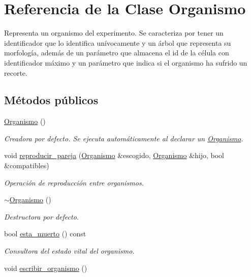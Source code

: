 \hypertarget{class_organismo}{\section{Referencia de la Clase Organismo}
\label{class_organismo}
}


Representa un organismo del experimento. Se caracteriza por tener un identificador que lo identifica unívocamente y un árbol que representa su morfología, además de un parámetro que almacena el id de la célula con identificador máximo y un parámetro que indica si el organismo ha sufrido un recorte.  


\subsection*{Métodos públicos}
\begin{DoxyCompactItemize}
\item 
\hyperlink{class_organismo_aa5dbeed205b53c0e555ef2a6456da144}{Organismo} ()
\begin{DoxyCompactList}\small\item\em Creadora por defecto. Se ejecuta automáticamente al declarar un \hyperlink{class_organismo}{Organismo}. \end{DoxyCompactList}\item 
void \hyperlink{class_organismo_a3a4ab01f4ad3cdc1d12361a7a3965009}{reproducir\-\_\-pareja} (\hyperlink{class_organismo}{Organismo} \&escogido, \hyperlink{class_organismo}{Organismo} \&hijo, bool \&compatibles)
\begin{DoxyCompactList}\small\item\em Operación de reproducción entre organismos. \end{DoxyCompactList}\item 
\hyperlink{class_organismo_ad1ba743e609a358f1479ebf341220747}{$\sim$\-Organismo} ()
\begin{DoxyCompactList}\small\item\em Destructora por defecto. \end{DoxyCompactList}\item 
bool \hyperlink{class_organismo_a0016a9b39db1bc624cc7db6f710675ad}{esta\-\_\-muerto} () const 
\begin{DoxyCompactList}\small\item\em Consultora del estado vital del organismo. \end{DoxyCompactList}\item 
void \hyperlink{class_organismo_a108a8201261bf905b3c11c705d9560c6}{escribir\-\_\-organismo} ()

\end{DoxyCompactItemize}
